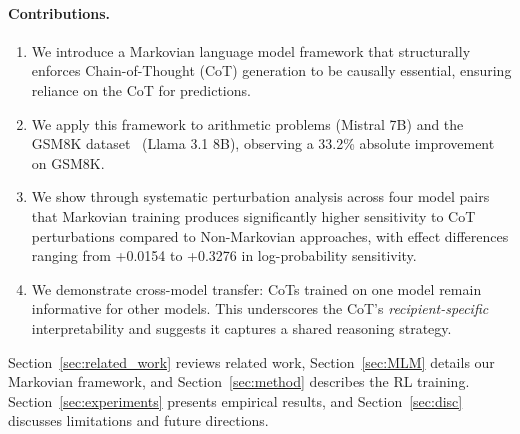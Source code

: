 \documentclass{article} %
\begin{document}
\paragraph{Contributions.}
\begin{enumerate}
    \item We introduce a Markovian language model framework that structurally enforces Chain-of-Thought (CoT) generation to be causally essential, ensuring reliance on the CoT for predictions.
    \item We apply this framework to arithmetic problems (Mistral 7B) and the GSM8K dataset~\citep{cobbe2021gsm8k} (Llama 3.1 8B), observing a 33.2\% absolute improvement on GSM8K.
    \item We show through systematic perturbation analysis across four model pairs that Markovian training produces significantly higher sensitivity to CoT perturbations compared to Non-Markovian approaches, with effect differences ranging from +0.0154 to +0.3276 in log-probability sensitivity.
    \item We demonstrate cross-model transfer: CoTs trained on one model remain informative for other models. This underscores the CoT's \emph{recipient-specific} interpretability and suggests it captures a shared reasoning strategy.
\end{enumerate}

Section~\ref{sec:related_work} reviews related work, Section~\ref{sec:MLM} details our Markovian framework, and Section~\ref{sec:method} describes the RL training. Section~\ref{sec:experiments} presents empirical results, and Section~\ref{sec:disc} discusses limitations and future directions.
\end{document}
